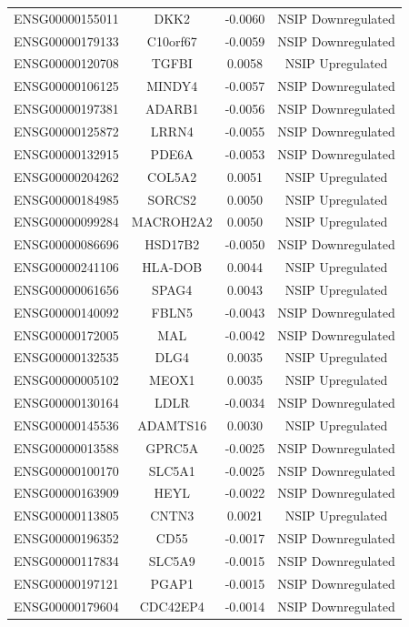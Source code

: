 \documentclass[
]{article}
\begin{document}
\begin{singlespace}
\begin{longtable}[t]{lccc}
ENSG00000155011 & DKK2 & -0.0060 & NSIP Downregulated\\
ENSG00000179133 & C10orf67 & -0.0059 & NSIP Downregulated\\
ENSG00000120708 & TGFBI & 0.0058 & NSIP Upregulated\\
\addlinespace
ENSG00000106125 & MINDY4 & -0.0057 & NSIP Downregulated\\
ENSG00000197381 & ADARB1 & -0.0056 & NSIP Downregulated\\
ENSG00000125872 & LRRN4 & -0.0055 & NSIP Downregulated\\
ENSG00000132915 & PDE6A & -0.0053 & NSIP Downregulated\\
ENSG00000204262 & COL5A2 & 0.0051 & NSIP Upregulated\\
\addlinespace
ENSG00000184985 & SORCS2 & 0.0050 & NSIP Upregulated\\
ENSG00000099284 & MACROH2A2 & 0.0050 & NSIP Upregulated\\
ENSG00000086696 & HSD17B2 & -0.0050 & NSIP Downregulated\\
ENSG00000241106 & HLA-DOB & 0.0044 & NSIP Upregulated\\
ENSG00000061656 & SPAG4 & 0.0043 & NSIP Upregulated\\
\addlinespace
ENSG00000140092 & FBLN5 & -0.0043 & NSIP Downregulated\\
ENSG00000172005 & MAL & -0.0042 & NSIP Downregulated\\
ENSG00000132535 & DLG4 & 0.0035 & NSIP Upregulated\\
ENSG00000005102 & MEOX1 & 0.0035 & NSIP Upregulated\\
ENSG00000130164 & LDLR & -0.0034 & NSIP Downregulated\\
\addlinespace
ENSG00000145536 & ADAMTS16 & 0.0030 & NSIP Upregulated\\
ENSG00000013588 & GPRC5A & -0.0025 & NSIP Downregulated\\
ENSG00000100170 & SLC5A1 & -0.0025 & NSIP Downregulated\\
ENSG00000163909 & HEYL & -0.0022 & NSIP Downregulated\\
ENSG00000113805 & CNTN3 & 0.0021 & NSIP Upregulated\\
\addlinespace
ENSG00000196352 & CD55 & -0.0017 & NSIP Downregulated\\
ENSG00000117834 & SLC5A9 & -0.0015 & NSIP Downregulated\\
ENSG00000197121 & PGAP1 & -0.0015 & NSIP Downregulated\\
ENSG00000179604 & CDC42EP4 & -0.0014 & NSIP Downregulated\\

\end{longtable}
\end{singlespace}
\end{document}
